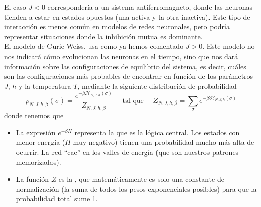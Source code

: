 \noindent
El caso $J < 0$ correspondería a un sistema antiferromagneto, donde las neuronas tienden a estar en estados opuestos (una activa y la otra inactiva). Este tipo de interacción es menos común en modelos de redes neuronales, pero podría representar situaciones donde la inhibición mutua es dominante. \\

\noindent
El modelo de Curie-Weiss, usa como ya hemos comentado $J>0$. Este modelo no nos indicará cómo evolucionan las neuronas en el tiempo, sino que nos dará información sobre las configuraciones de equilibrio del sistema, es decir, cuáles son las configuraciones más probables de encontrar en función de los parámetros $J$, $h$ y la temperatura $T$, mediante la siguiente distribución de probabilidad
\begin{equation*}
    \rho_{N,J,h,\beta}(\sigma) = \frac{e^{-\beta \mathcal{H}_{N,J,h}(\sigma)}}{Z_{N,J,h,\beta}} \quad \text{ tal que } \quad Z_{N,J,h,\beta} = \sum_{\sigma} e^{-\beta \mathcal{H}_{N,J,h}(\sigma)}
\end{equation*}
donde tenemos que 
\begin{itemize}
    \item La expresión $e^{-\beta H}$ representa la  que es la lógica central. Los estados con menor energía ($H$ muy negativo) tienen una probabilidad mucho más alta de ocurrir. La red ``cae'' en los valles de energía (que son nuestros patrones memorizados).
    \item La función $Z$ es la , que matemáticamente es solo una constante de normalización (la suma de todos los pesos exponenciales posibles) para que la probabilidad total sume 1.
\end{itemize}

